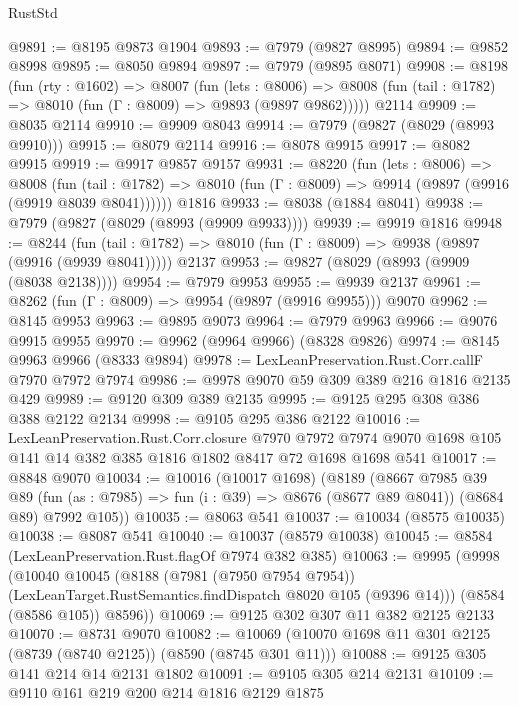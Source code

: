 \begin{lexlean}{RustStd}
\begin{coremodule}
@9891 := @8195 @9873 @1904
@9893 := @7979 (@9827 @8995)
@9894 := @9852 @8998
@9895 := @8050 @9894
@9897 := @7979 (@9895 @8071)
@9908 := @8198
    (fun (rty : @1602) =>
    @8007
      (fun (lets : @8006) =>
      @8008 (fun (tail : @1782) => @8010 (fun (Γ : @8009) => @9893 (@9897 @9862)))))
    @2114
@9909 := @8035 @2114
@9910 := @9909 @8043
@9914 := @7979 (@9827 (@8029 (@8993 @9910)))
@9915 := @8079 @2114
@9916 := @8078 @9915
@9917 := @8082 @9915
@9919 := @9917 @9857 @9157
@9931 := @8220
    (fun (lets : @8006) =>
    @8008
      (fun (tail : @1782) => @8010 (fun (Γ : @8009) => @9914 (@9897 (@9916 (@9919 @8039 @8041))))))
    @1816
@9933 := @8038 (@1884 @8041)
@9938 := @7979 (@9827 (@8029 (@8993 (@9909 @9933))))
@9939 := @9919 @1816
@9948 := @8244
    (fun (tail : @1782) => @8010 (fun (Γ : @8009) => @9938 (@9897 (@9916 (@9939 @8041)))))
    @2137
@9953 := @9827 (@8029 (@8993 (@9909 (@8038 @2138))))
@9954 := @7979 @9953
@9955 := @9939 @2137
@9961 := @8262 (fun (Γ : @8009) => @9954 (@9897 (@9916 @9955))) @9070
@9962 := @8145 @9953
@9963 := @9895 @9073
@9964 := @7979 @9963
@9966 := @9076 @9915 @9955
@9970 := @9962 (@9964 @9966) (@8328 @9826)
@9974 := @8145 @9963 @9966 (@8333 @9894)
@9978 := LexLeanPreservation.Rust.Corr.callF @7970 @7972 @7974
@9986 := @9978 @9070 @59 @309 @389 @216 @1816 @2135 @429
@9989 := @9120 @309 @389 @2135
@9995 := @9125 @295 @308 @386 @388 @2122 @2134
@9998 := @9105 @295 @386 @2122
@10016 := LexLeanPreservation.Rust.Corr.closure
    @7970
    @7972
    @7974
    @9070
    @1698
    @105
    @141
    @14
    @382
    @385
    @1816
    @1802
    @8417
    @72
    @1698
    @1698
    @541
@10017 := @8848 @9070
@10034 := @10016
    (@10017 @1698)
    (@8189
      (@8667
        @7985
        @39
        @89
        (fun (as : @7985) => fun (i : @39) => @8676 (@8677 @89 @8041))
        (@8684 @89)
        @7992
        @105))
@10035 := @8063 @541
@10037 := @10034 (@8575 @10035)
@10038 := @8087 @541
@10040 := @10037 (@8579 @10038)
@10045 := @8584 (LexLeanPreservation.Rust.flagOf @7974 @382 @385)
@10063 := @9995
    (@9998
      (@10040
        @10045
        (@8188
          (@7981 (@7950 @7954 @7954))
          (LexLeanTarget.RustSemantics.findDispatch @8020 @105 (@9396 @14)))
        (@8584 (@8586 @105))
        @8596))
@10069 := @9125 @302 @307 @11 @382 @2125 @2133
@10070 := @8731 @9070
@10082 := @10069 (@10070 @1698 @11 @301 @2125 (@8739 (@8740 @2125)) (@8590 (@8745 @301 @11)))
@10088 := @9125 @305 @141 @214 @14 @2131 @1802
@10091 := @9105 @305 @214 @2131
@10109 := @9110
    @161
    @219
    @200
    @214
    @1816
    @2129
    @1875

\end{coremodule}
\end{lexlean}
